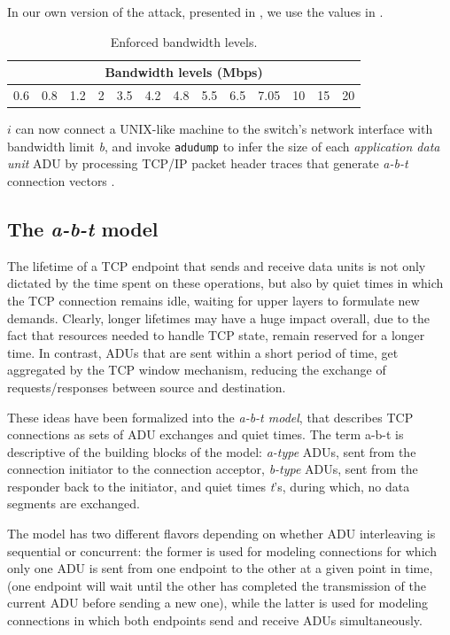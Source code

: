 In our own version of the attack, presented in , we use
the values in . 

\begin{table}[htb]
  \centering
  \begin{tabular}{|c|c|c|c|c|c|c|c|c|c|c|c|c|}
    \hline
    \multicolumn{13}{|c|}{\textbf{Bandwidth levels (Mbps)}} \\
    \hline
    0.6 & 0.8 & 1.2 & 2 & 3.5 & 4.2 & 4.8 & 5.5 & 6.5 & 7.05 & 10 & 15 & 20 \\ 
    \hline
  \end{tabular}
  \caption{Enforced bandwidth levels.}
  \label{tab:bandwidths}
\end{table}

$i$ can now connect a UNIX-like machine to the switch's network interface
with bandwidth limit \emph{b}, and invoke \texttt{adudump} to infer the size of
each \emph{application data unit} ADU by processing TCP/IP packet header
traces that generate \emph{a-b-t} connection vectors \cite{hernandez}.

\subsection{The \emph{a-b-t} model}

The lifetime of a TCP endpoint that sends and receive data units is not only
dictated by the time spent on these operations, but also by quiet times in
which the TCP connection remains idle, waiting for upper layers to formulate
new demands. Clearly, longer lifetimes may have a huge impact overall, due to
the fact that resources needed to handle TCP state, remain reserved for a
longer time. In contrast, ADUs that are sent within a short period of time, get
aggregated by the TCP window mechanism, reducing the exchange of
requests/responses between source and destination.

These ideas have been formalized into the \emph{a-b-t model}, that describes
TCP connections as sets of ADU exchanges and quiet times. The term a-b-t is
descriptive of the building blocks of the model: \emph{a-type} ADUs, sent from
the connection initiator to the connection acceptor, \emph{b-type} ADUs, sent
from the responder back to the initiator, and quiet times \emph{t}'s, during
which, no data segments are exchanged.

The model has two different flavors depending on whether ADU interleaving is
sequential or concurrent: the former is used for modeling connections for which
only one ADU is sent from one endpoint to the other at a given point in time,
(one endpoint will wait until the other has completed the transmission of the
current ADU before sending a new one), while the latter is used for modeling
connections in which both endpoints send and receive ADUs simultaneously.

